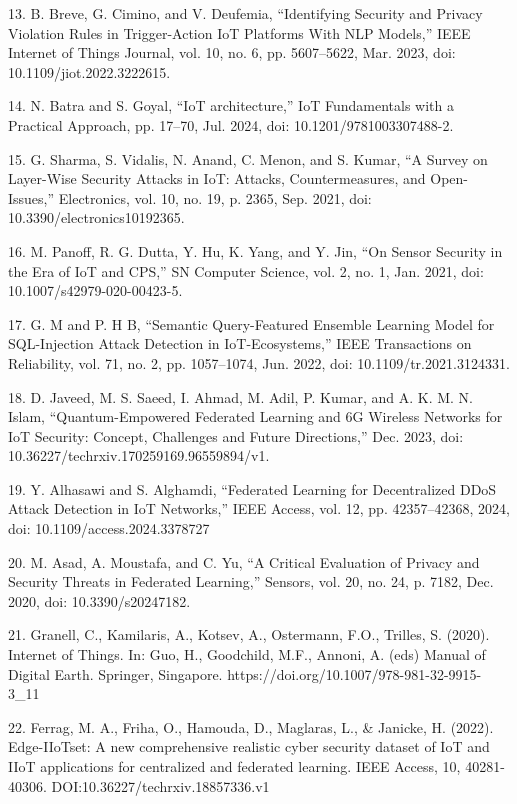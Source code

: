 13. B. Breve, G. Cimino, and V. Deufemia, ``Identifying Security and
Privacy Violation Rules in Trigger-Action IoT Platforms With NLP
Models,'' IEEE Internet of Things Journal, vol. 10, no. 6, pp.
5607--5622, Mar. 2023, doi: 10.1109/jiot.2022.3222615.

14. N. Batra and S. Goyal, ``IoT architecture,'' IoT Fundamentals with a
Practical Approach, pp. 17--70, Jul. 2024, doi: 10.1201/9781003307488-2.

15. G. Sharma, S. Vidalis, N. Anand, C. Menon, and S. Kumar, ``A Survey
on Layer-Wise Security Attacks in IoT: Attacks, Countermeasures, and
Open-Issues,'' Electronics, vol. 10, no. 19, p. 2365, Sep. 2021, doi:
10.3390/electronics10192365.

16. M. Panoff, R. G. Dutta, Y. Hu, K. Yang, and Y. Jin, ``On Sensor
Security in the Era of IoT and CPS,'' SN Computer Science, vol. 2, no.
1, Jan. 2021, doi: 10.1007/s42979-020-00423-5.

17. G. M and P. H B, ``Semantic Query-Featured Ensemble Learning Model
for SQL-Injection Attack Detection in IoT-Ecosystems,'' IEEE
Transactions on Reliability, vol. 71, no. 2, pp. 1057--1074, Jun. 2022,
doi: 10.1109/tr.2021.3124331.

18. D. Javeed, M. S. Saeed, I. Ahmad, M. Adil, P. Kumar, and A. K. M. N.
Islam, ``Quantum-Empowered Federated Learning and 6G Wireless Networks
for IoT Security: Concept, Challenges and Future Directions,'' Dec.
2023, doi: 10.36227/techrxiv.170259169.96559894/v1.

19. Y. Alhasawi and S. Alghamdi, ``Federated Learning for Decentralized
DDoS Attack Detection in IoT Networks,'' IEEE Access, vol. 12, pp.
42357--42368, 2024, doi: 10.1109/access.2024.3378727

20. M. Asad, A. Moustafa, and C. Yu, ``A Critical Evaluation of Privacy
and Security Threats in Federated Learning,'' Sensors, vol. 20, no. 24,
p. 7182, Dec. 2020, doi: 10.3390/s20247182.

21. Granell, C., Kamilaris, A., Kotsev, A., Ostermann, F.O., Trilles, S.
(2020). Internet of Things. In: Guo, H., Goodchild, M.F., Annoni, A.
(eds) Manual of Digital Earth. Springer, Singapore.
https://doi.org/10.1007/978-981-32-9915-3\_11

22. Ferrag, M. A., Friha, O., Hamouda, D., Maglaras, L., \& Janicke, H.
(2022). Edge-IIoTset: A new comprehensive realistic cyber security
dataset of IoT and IIoT applications for centralized and federated
learning. IEEE Access, 10, 40281-40306.
DOI:10.36227/techrxiv.18857336.v1

